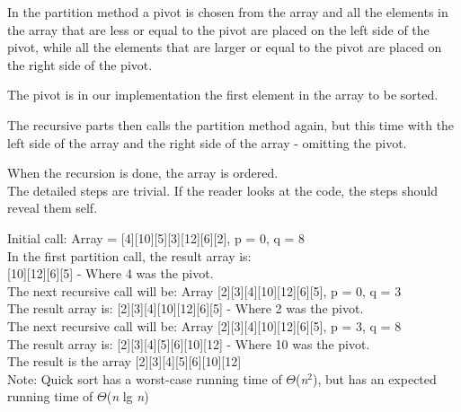 \documentclass[12pt,a4paper]{article}
\begin{document}
In the partition method a pivot is chosen from the array and all the elements in the array that are less or equal to the pivot are placed on the left side of the pivot, while all the elements that are larger or equal to the pivot are placed on the right side of the pivot.

The pivot is in our implementation the first element in the array to be sorted.

The recursive parts then calls the partition method again, but this time with the left side of the array and the right side of the array - omitting the pivot.

When the recursion is done, the array is ordered.\\

The detailed steps are trivial. If the reader looks at the code, the steps should reveal them self.

\noindent
Initial call: Array = [4][10][5][3][12][6][2], p = 0, q = 8\\
\noindent
In the first partition call, the result array is: \\
\noindent
[2][3]{\color{blue}[4]}[10][12][6][5] - Where 4 was the pivot.\\

\noindent
The next recursive call will be: Array [2][3][4][10][12][6][5], p = 0, q = 3\\
\noindent
The result array is:
{\color{blue}[2]}[3][4][10][12][6][5] - Where 2 was the pivot.\\

\noindent
The next recursive call will be: Array [2][3][4][10][12][6][5], p = 3, q = 8\\
\noindent
The result array is:
[2][3][4][5][6]{\color{blue}[10]}[12] - Where 10 was the pivot.\\



\noindent
The result is the array [2][3][4][5][6][10][12]\\
\noindent
Note: Quick sort has a worst-case running time of $\Theta$(\textit{n$^{2}$}), but has an expected running time of $\Theta$(\textit{n} lg \textit{n})

\clearpage
\end{document}
